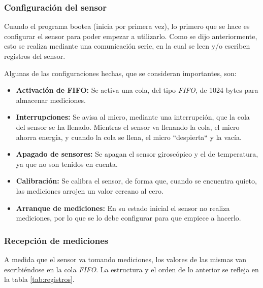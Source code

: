 \documentclass{article}
\begin{document}
    \subsubsection{Configuración del sensor}
    Cuando el programa bootea (inicia por primera vez), lo primero que se hace
    es configurar el sensor para poder empezar a utilizarlo. Como se dijo 
    anteriormente, esto se realiza mediante una comunicación serie, en la cual
    se leen y/o escriben registros del sensor. \par
    Algunas de las configuraciones hechas, que se consideran importantes, son:
    \begin{itemize}
        \item \textbf{Activación de FIFO:} Se activa una cola, del tipo
        \emph{FIFO}, de 1024 bytes para almacenar mediciones.
        \item \textbf{Interrupciones:} Se avisa al micro, mediante una 
        interrupción, que la cola del sensor se ha llenado. Mientras el sensor
        va llenando la cola, el micro ahorra energía, y cuando la cola se llena,
        el micro ``despierta`` y la vacía.
        \item \textbf{Apagado de sensores:} Se apagan el sensor giroscópico y 
        el de temperatura, ya que no son tenidos en cuenta.
        \item \textbf{Calibración:} Se calibra el sensor, de forma que, cuando
        se encuentra quieto, las mediciones arrojen un valor cercano al cero.
        \item \textbf{Arranque de mediciones:} En su estado inicial el sensor
        no realiza mediciones, por lo que se lo debe configurar para que 
        empiece a hacerlo.
    \end{itemize}

    \subsubsection{Recepción de mediciones}
    A medida que el sensor va tomando mediciones, los valores de las mismas
    van escribiéndose en la cola \emph{FIFO}. La estructura y el orden de lo 
    anterior se refleja en la tabla \ref{tab:registros}. \par
\end{document}
